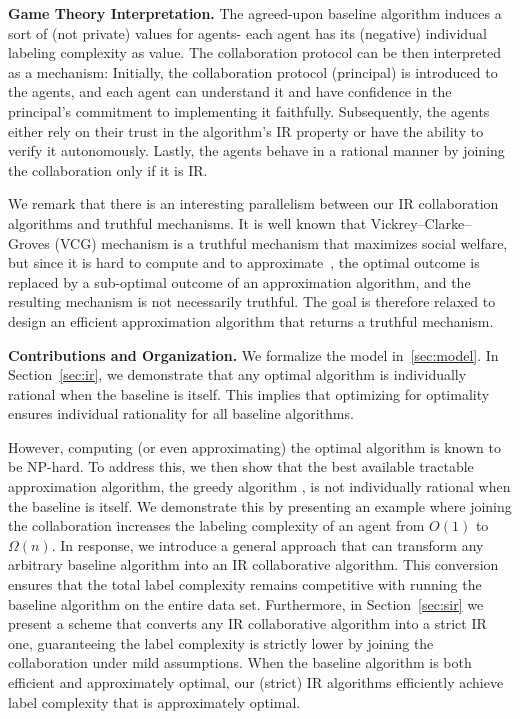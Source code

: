 \textbf{Game Theory Interpretation.} 
The agreed-upon baseline algorithm induces a sort of (not private) values for agents- each agent has its (negative) individual labeling complexity as value. 
The collaboration protocol can be then interpreted as a mechanism: 
Initially, the collaboration protocol (principal) is introduced to the agents, and each agent can understand it and have confidence in the principal's commitment to implementing it faithfully. Subsequently, the agents either rely on their trust in the algorithm's IR property or have the ability to verify it autonomously. Lastly, the agents behave in a rational manner by joining the collaboration only if it is IR.

We remark that there is an interesting parallelism between our IR collaboration algorithms and  truthful mechanisms. It is well known that Vickrey–Clarke–Groves (VCG) mechanism is a truthful mechanism that maximizes social welfare, but since it is hard to compute and to approximate~\citep{Buchfuhrer10}, the optimal outcome is replaced by a sub-optimal outcome of an approximation algorithm, and the resulting mechanism is not necessarily truthful. The goal is therefore relaxed to design an efficient approximation algorithm that returns a truthful mechanism. 





\textbf{Contributions and Organization.} We formalize the model in~\ref{sec:model}. In Section~\ref{sec:ir}, we demonstrate that any optimal algorithm is individually rational when the baseline is itself. This implies that optimizing for optimality ensures individual rationality for all baseline algorithms.

However, computing (or even approximating) the optimal algorithm is known to be NP-hard. To address this, we then show that the best available tractable approximation algorithm, the greedy algorithm \cite{kosaraju2002optimal,dasgupta2004analysis}, is not individually rational when the baseline is itself.
We demonstrate this by presenting an example where joining the collaboration increases the labeling complexity of an agent from $O(1)$ to $\Omega(n)$. 
In response, we introduce a general approach that can transform any arbitrary baseline algorithm into an IR collaborative algorithm. This conversion ensures that the total label complexity remains competitive with running the baseline algorithm on the entire data set. Furthermore, in Section~\ref{sec:sir} we present a scheme that converts any IR collaborative algorithm into a strict IR one, guaranteeing the label complexity is strictly lower by joining the collaboration under mild assumptions. 
When the baseline algorithm is both efficient and approximately optimal, our (strict) IR algorithms efficiently achieve label complexity that is approximately optimal.



